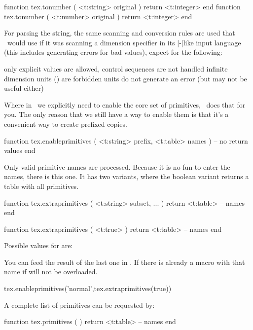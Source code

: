 \starttyping[option=LUA]
function tex.tonumber ( <t:string> original ) return <t:integer> end
function tex.tonumber ( <t:number> original ) return <t:integer> end
\stoptyping

For parsing the string, the same scanning and conversion rules are used that
\LUATEX\ would use if it was scanning a dimension specifier in its \TEX|-|like
input language (this includes generating errors for bad values), expect for the
following:

\startitemize[n,packed]
\startitem
    only explicit values are allowed, control sequences are not handled
\stopitem
\startitem
    infinite dimension units () are forbidden
\stopitem
\startitem
     units do not generate an error (but may not be useful either)
\stopitem
\stopitemize

\stopsubsection

\startsubsection[title={Primitives}]

Where in \LUATEX\ we explicitly need to enable the core set of primitives,
\LUAMETATEX\ does that for you. The only reason that we still have a way
to enable them is that it's a convenient way to create prefixed copies.

\starttyping[option=LUA]
function tex.enableprimitives (
    <t:string> prefix,
    <t:table>  names
)
    -- no return values
end
\stoptyping

Only valid primitive names are processed. Because it is no fun to enter the
names, there is this one. It has two variants, where the boolean variant returns
a table with all primitives.

\starttyping[option=LUA]
function tex.extraprimitives ( <t:string> subset, ... )
    return <t:table> -- names
end

function tex.extraprimitives ( <t:true> )
    return <t:table> -- names
end
\stoptyping

Possible values for  are:


You can feed the result of the last one in . If
there is already a macro with that name if will not be overloaded.

\starttyping[option=LUA]
tex.enableprimitives('normal',tex.extraprimitives(true))
\stoptyping

A complete list of primitives can be requested by:

\starttyping[option=LUA]
function tex.primitives ( )
    return <t:table> -- names
end
\stoptyping

